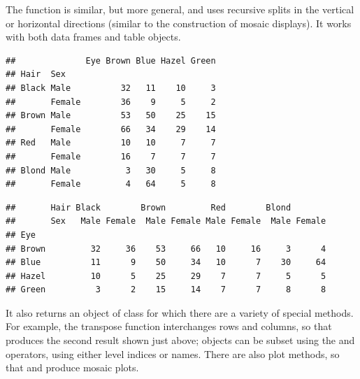 \documentclass[11pt]{book}
\renewenvironment{knitrout}{\small\renewcommand{\baselinestretch}{.85}}{} %
\begin{document}
The  function is similar, but more general, and uses
recursive splits in the vertical or horizontal directions
(similar to the construction of mosaic displays).  It works with both
data frames and table objects.
\begin{knitrout}
\color{fgcolor}\begin{kframe}
\begin{alltt}
                   
\end{alltt}
\begin{verbatim}
##              Eye Brown Blue Hazel Green
## Hair  Sex                              
## Black Male          32   11    10     3
##       Female        36    9     5     2
## Brown Male          53   50    25    15
##       Female        66   34    29    14
## Red   Male          10   10     7     7
##       Female        16    7     7     7
## Blond Male           3   30     5     8
##       Female         4   64     5     8
\end{verbatim}
\begin{alltt}
\hlopt{+} \hlopt{~}    
\end{alltt}
\begin{verbatim}
##       Hair Black        Brown         Red        Blond       
##       Sex   Male Female  Male Female Male Female  Male Female
## Eye                                                          
## Brown         32     36    53     66   10     16     3      4
## Blue          11      9    50     34   10      7    30     64
## Hazel         10      5    25     29    7      7     5      5
## Green          3      2    15     14    7      7     8      8
\end{verbatim}
\end{kframe}
\end{knitrout}
It also returns an object of class  for which there are a
variety of special methods.  For example, the transpose function 
interchanges rows and columns, so that 
produces the second result shown just above;
 objects can be subset using the 
\code{[} and \code{[[} operators, using either level indices or names.
There are also plot methods, so that  and 
produce mosaic plots.
\end{document}

